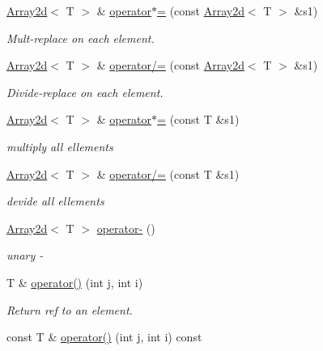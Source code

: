 \begin{DoxyCompactItemize}
\mbox{\hyperlink{classXMLArray_1_1Array2d}{Array2d}}$<$ T $>$ \& \mbox{\hyperlink{classXMLArray_1_1Array2d_a591d1e6e7de9fd024657bb6e9264a89b}{operator$\ast$=}} (const \mbox{\hyperlink{classXMLArray_1_1Array2d}{Array2d}}$<$ T $>$ \&s1)
\begin{DoxyCompactList}\small\item\em Mult-\/replace on each element. \end{DoxyCompactList}\item 
\mbox{\hyperlink{classXMLArray_1_1Array2d}{Array2d}}$<$ T $>$ \& \mbox{\hyperlink{classXMLArray_1_1Array2d_a704df3d7442ab68977e0caa8f8f059cd}{operator/=}} (const \mbox{\hyperlink{classXMLArray_1_1Array2d}{Array2d}}$<$ T $>$ \&s1)
\begin{DoxyCompactList}\small\item\em Divide-\/replace on each element. \end{DoxyCompactList}\item 
\mbox{\hyperlink{classXMLArray_1_1Array2d}{Array2d}}$<$ T $>$ \& \mbox{\hyperlink{classXMLArray_1_1Array2d_aee0e6a53c2f9dcc263ba59286d359b38}{operator$\ast$=}} (const T \&s1)
\begin{DoxyCompactList}\small\item\em multiply all ellements \end{DoxyCompactList}\item 
\mbox{\hyperlink{classXMLArray_1_1Array2d}{Array2d}}$<$ T $>$ \& \mbox{\hyperlink{classXMLArray_1_1Array2d_aa699e2de82efb77e8e5e875a63eb7d8b}{operator/=}} (const T \&s1)
\begin{DoxyCompactList}\small\item\em devide all ellements \end{DoxyCompactList}\item 
\mbox{\hyperlink{classXMLArray_1_1Array2d}{Array2d}}$<$ T $>$ \mbox{\hyperlink{classXMLArray_1_1Array2d_a650034573254ebdd7c914d68a498e2c9}{operator-\/}} ()
\begin{DoxyCompactList}\small\item\em unary -\/ \end{DoxyCompactList}\item 
T \& \mbox{\hyperlink{classXMLArray_1_1Array2d_ab8618dbef1cc6b94b3345ce3da0ad996}{operator()}} (int j, int i)
\begin{DoxyCompactList}\small\item\em Return ref to an element. \end{DoxyCompactList}\item 
const T \& \mbox{\hyperlink{classXMLArray_1_1Array2d_aa02dc8ee58bd33aca0cfbbf58cbf1ba7}{operator()}} (int j, int i) const

\end{DoxyCompactItemize}
